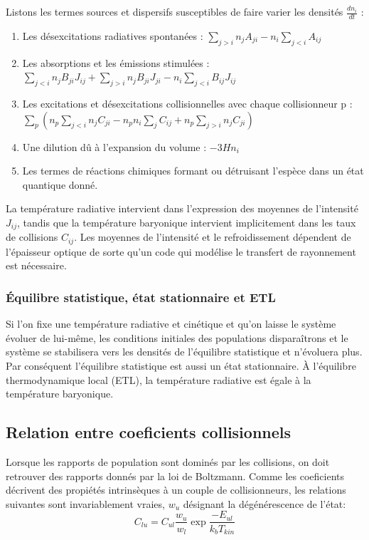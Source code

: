 \documentclass[10pt, a4paper]{report}
\numberwithin{equation}{subsection}
\begin{document}
Listons les termes sources et dispersifs susceptibles de faire varier les densités $\frac{dn_i}{dt}$ :\\

\begin{enumerate}
	\item Les désexcitations radiatives spontanées : $\sum\limits_{j>i} n_jA_{ji}-n_i\sum\limits_{j<i} A_{ij}$
	\item Les absorptions et les émissions stimulées : $\sum\limits_{j<i} n_jB_{ji}J_{ij}+\sum\limits_{j>i} n_jB_{ji}J_{ji}-n_i\sum\limits_{j<i}B_{ij}J_{ij}$
	\item Les excitations et désexcitations collisionnelles avec chaque collisionneur p : \\ $\sum\limits_p\left(n_p\sum\limits_{j<i} n_j C_{ji}-n_pn_i\sum\limits_j C_{ij}+n_p\sum\limits_{j>i}n_j C_{ji}\right)$
	\item Une dilution dû à l'expansion du volume : $-3Hn_i$\\
	\item Les termes de réactions chimiques formant ou détruisant l'espèce dans un état quantique donné.
\end{enumerate}
\medskip
\normalsize
La température radiative intervient dans l'expression des moyennes de l'intensité $J_{ij}$, tandis que la température baryonique intervient implicitement dans les taux de collisions $C_{ij}$. Les moyennes de l'intensité et le refroidissement dépendent de l'épaisseur optique de sorte qu'un code qui modélise le transfert de rayonnement est nécessaire. 

\subsubsection{\uppercase{é}quilibre statistique, état stationnaire et ETL}
Si l'on fixe une température radiative et cinétique et qu'on laisse le système évoluer de lui-même, les conditions initiales des populations disparaîtrons et le système se stabilisera vers les densités de l'équilibre statistique et n'évoluera plus. Par conséquent l'équilibre statistique est aussi un état stationnaire. À l'équilibre thermodynamique local (ETL), la température radiative est égale à la température baryonique. 

\subsection{Relation entre coeficients collisionnels}
Lorsque les rapports de population sont dominés par les collisions, on doit retrouver des rapports donnés par la loi de Boltzmann. Comme les coeficients décrivent des propiétés intrinsèques à un couple de collisionneurs, les relations suivantes sont invariablement vraies, $w_u$ désignant la dégénérescence de l'état:
\begin{equation} \label{eq:DB}
 \boxed{C_{lu} = C_{ul}\frac{w_u}{w_l}\exp{\frac{-E_{ul}}{k_b T_{kin}}}}
\end{equation}
\end{document}
